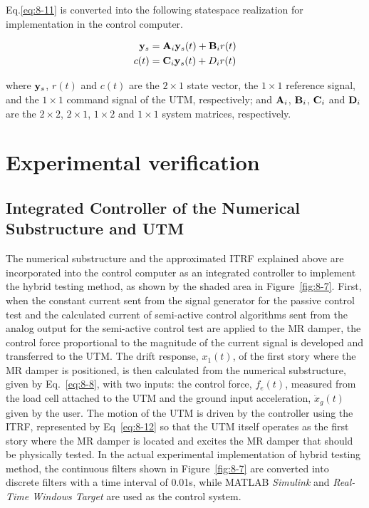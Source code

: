 Eq.\eqref{eq:8-11} is converted into the following statespace realization for implementation in the control computer.

\begin{equation}\label{eq:8-12}
\begin{aligned}
\mathbf{y}_{s} & = \mathbf{A}_{i}\mathbf{y}_{s}(t) + \mathbf{B}_{i}r(t) \\
c(t) &= \mathbf{C}_{i}\mathbf{y}_{s}(t) + D_{i}r(t)
\end{aligned}
\end{equation}

where $\mathbf{y}_{s}$, $r(t)$ and $c(t)$ are the $2\times1$ state vector, the $1\times1$ reference signal, and the $1\times1$ command signal of the UTM, respectively; and $\mathbf{A}_{i}$, $\mathbf{B}_{i}$, $\mathbf{C}_{i}$ and $\mathbf{D}_{i}$ are the $2\times2$, $2\times1$, $1\times2$ and $1\times1$ system matrices, respectively.

\section{Experimental verification}
\subsection{Integrated Controller of the Numerical Substructure and UTM}

The numerical substructure and the approximated ITRF explained above are incorporated into the control computer as an integrated controller to implement the hybrid testing method, as shown by the shaded area in Figure~\ref{fig:8-7}. First, when the constant current sent from the signal generator for the passive control test and the calculated current of semi-active control algorithms sent from the analog output for the semi-active control test are applied to the MR damper, the control force proportional to the magnitude of the current signal is developed and transferred to the UTM. The drift response, $x_{1}(t)$, of the first story where the MR damper is positioned, is then calculated from the numerical substructure, given by Eq.~\eqref{eq:8-8}, with two inputs: the control force, $f_{e}(t)$, measured from the load cell attached to the UTM and the ground input acceleration, $\ddot{x}_{g}(t)$ given by the user. The motion of the UTM is driven by the controller using the ITRF, represented by Eq~\eqref{eq:8-12} so that the UTM itself operates as the first story where the MR damper is located and excites the MR damper that should be physically tested. In the actual experimental implementation of hybrid testing method, the continuous filters shown in Figure~\ref{fig:8-7} are converted into discrete filters with a time interval of 0.01s, while MATLAB \textit{Simulink}\citep{simulink2009version} and \textit{Real-Time Windows Target}\citep{targetuser} are used as the control system.

